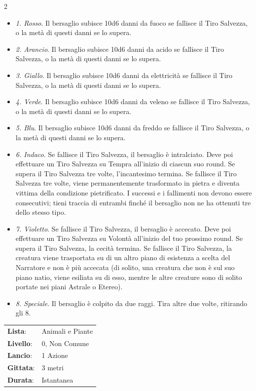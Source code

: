 \begin{multicols}{2}
\begin{itemize}[leftmargin=*] \setlength{\itemsep}{0pt}
	\item \emph{1. Rosso}. Il bersaglio subisce 10d6 danni da fuoco se fallisce il Tiro Salvezza, o la metà di questi danni se lo supera.
	\item \emph{2. Arancio}. Il bersaglio subisce 10d6 danni da acido se fallisce il Tiro Salvezza, o la metà di questi danni se lo supera.
	\item \emph{3. Giallo}. Il bersaglio subisce 10d6 danni da elettricità se fallisce il Tiro Salvezza, o la metà di questi danni se lo supera.
	\item \emph{4. Verde}. Il bersaglio subisce 10d6 danni da veleno se fallisce il Tiro Salvezza, o la metà di questi danni se lo supera.
	\item \emph{5. Blu}. Il bersaglio subisce 10d6 danni da freddo se fallisce il Tiro Salvezza, o la metà di questi danni se lo supera.
	\item \emph{6. Indaco}. Se fallisce il Tiro Salvezza, il bersaglio è intralciato. Deve poi effettuare un Tiro Salvezza su Tempra all'inizio di ciascun suo round. Se supera il Tiro Salvezza tre volte, l'incantesimo termina. Se fallisce il Tiro Salvezza tre volte, viene permanentemente trasformato in pietra e diventa vittima della condizione pietrificato. I successi e i fallimenti non devono essere consecutivi; tieni traccia di entrambi finché il bersaglio non ne ha ottenuti tre dello stesso tipo.
	\item \emph{7. Violetto}. Se fallisce il Tiro Salvezza, il bersaglio è accecato. Deve poi effettuare un Tiro Salvezza su Volontà all'inizio del tuo prossimo round. Se supera il Tiro Salvezza, la cecità termina. Se fallisce il Tiro Salvezza, la creatura viene trasportata su di un altro piano di esistenza a scelta del Narratore e non è più accecata (di solito, una creatura che non è sul suo piano natio, viene esiliata su di esso, mentre le altre creature sono di solito portate nei piani Astrale o Etereo).
	\item \emph{8. Speciale}. Il bersaglio è colpito da due raggi. Tira altre due volte, ritirando gli 8.

\end{itemize}

\noindent\begin{tabularx}{\linewidth}{p{1.9cm}X}
	\rowcolor{gray!20}\textbf{Lista}: & Animali e Piante \\
	\textbf{Livello}: & 0, Non Comune \\
	\rowcolor{gray!20}\textbf{Lancio}: & 1 Azione \\
	\textbf{Gittata}: & 3 metri \\
	\rowcolor{gray!20}\textbf{Durata}: & Istantanea \\
\end{tabularx}\smallskip


\end{multicols}
